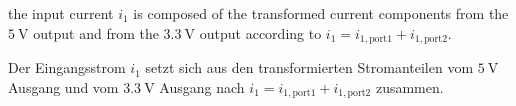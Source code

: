 \begin{hintblock}
    the input current $i_\mathrm{1}$ is composed of the transformed current components from the $\SI{5}{\volt}$ output and from the $\SI{3.3}{\volt}$ output according 
    to $i_\mathrm{1}=i_\mathrm{1,port1} + i_\mathrm{1,port2}$.   
\end{hintblock}
\begin{germanhintblock} 
    Der Eingangsstrom $i_\mathrm{1}$ setzt sich aus den transformierten Stromanteilen vom $\SI{5}{\volt}$ Ausgang und vom $\SI{3.3}{\volt}$ Ausgang 
    nach  $i_\mathrm{1}=i_\mathrm{1,port1} + i_\mathrm{1,port2}$ zusammen.
\end{germanhintblock}


